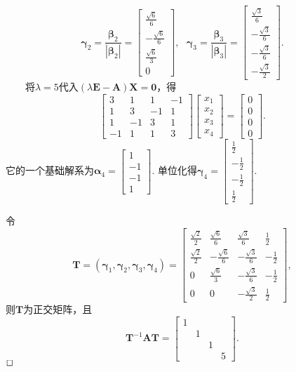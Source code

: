 \documentclass[compress,mathserif,cjk]{beamer}
\theoremstyle{remark}
\numberwithin{equation}{section}
\begin{document}
\begin{CJK}{UTF8}{gbsn}
\begin{frame}
\begin{equation*}
\bm\gamma_2=\frac{\bm\beta_2}{|\bm\beta_2|}=\left[\begin{matrix}\frac{\sqrt6}6\\-\frac{\sqrt6}6\\\frac{\sqrt6}3\\0\end{matrix}\right],~~~
\bm\gamma_3=\frac{\bm\beta_3}{|\bm\beta_3|}=\left[\begin{matrix}\frac{\sqrt3}6\\-\frac{\sqrt3}6\\-\frac{\sqrt3}6\\-\frac{\sqrt3}2\end{matrix}\right].
\end{equation*}
\pause\ \ \ \ 将$\lambda=5$代入$(\lambda\bm E-\bm A)\bm X=\bm0$，得
$$\left[\begin{matrix}3&1&1&-1\\1&3&-1&1\\1&-1&3&1\\-1&1&1&3\end{matrix}\right]\left[\begin{matrix}x_1\\x_2\\x_3\\x_4\end{matrix}\right]
=\left[\begin{matrix}0\\0\\0\\0\end{matrix}\right].$$
它的一个基础解系为$\bm\alpha_4=\left[\begin{matrix}1\\-1\\-1\\1\end{matrix}\right]$. 单位化得$\bm\gamma_4=\left[\begin{matrix}\frac{1}2\\-\frac{1}2\\-\frac{1}2\\\frac{1}2\end{matrix}\right]$.
\end{frame}
\begin{frame}
 令
 $$\bm T=(\bm\gamma_1,\bm\gamma_2,\bm\gamma_3,\bm\gamma_4)=\left[\begin{matrix}\frac{\sqrt2}2&\frac{\sqrt6}6&\frac{\sqrt3}6&\frac{1}2
 \\\frac{\sqrt2}2&-\frac{\sqrt6}6&-\frac{\sqrt3}6&-\frac{1}2\\0&\frac{\sqrt6}3&-\frac{\sqrt3}6&-\frac{1}2\\0&0&-\frac{\sqrt3}2&\frac{1}2\end{matrix}\right],$$
 则$\bm T$为正交矩阵，且
 $$\bm T^{-1}\bm{AT}=\left[\begin{matrix}1&&&\\&1&&\\&&1&\\&&&5\end{matrix}\right].$$ $\hfill\Box$
\end{frame}


\end{CJK}
\end{document}
